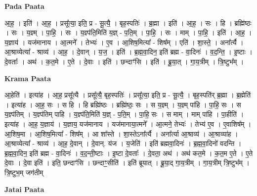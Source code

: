 \documentclass[17pt]{extarticle}
\begin{document}
\textbf{Pada Paata} \newline

आ॒ह॒ । इति॑ । आ॒ह॒ । प्रसू᳚त्या॒ इति॒ प्र - सू॒त्यै॒ । बृह॒स्पतिः॑ । ब्र॒ह्मा । इति॑ । आ॒ह॒ । सः । हि । ब्रह्मि॑ष्ठः । सः । य॒ज्ञ्म् । पा॒हि॒ । सः । य॒ज्ञ्प॑ति॒मिति॑ य॒ज्ञ् - प॒ति॒म् । पा॒हि॒ । सः । माम् । पा॒हि॒ । इति॑ । आ॒ह॒ । य॒ज्ञाय॑ । यज॑मानाय । आ॒त्मने᳚ । तेभ्यः॑ । ए॒व । आ॒शिष॒मित्या᳚ - शिष᳚म् । एति॑ । शा॒स्ते॒ । अना᳚र्त्यै । आ॒श्राव्येत्या᳚ - श्राव्य॑ । आ॒ह॒ । दे॒वान् । य॒ज॒ । इति॑ । ब्र॒ह्म॒वा॒दिन॒ इति॑ ब्रह्म - वा॒दिनः॑ । व॒द॒न्ति॒ । इ॒ष्टाः । दे॒वताः᳚ । अथ॑ । क॒त॒मे । ए॒ते । दे॒वाः । इति॑ । छन्दाꣳ॑सि । इति॑ । ब्रू॒या॒त् । गा॒य॒त्रीम् । त्रि॒ष्टुभ᳚म् ।  \newline


\textbf{Krama Paata} \newline

आ॒हेति॑ । इत्या॑ह । आ॒ह॒ प्रसू᳚त्यै । प्रसू᳚त्यै॒ बृह॒स्पतिः॑ । प्रसू᳚त्या॒ इति॒ प्र - सू॒त्यै॒ । बृह॒स्पति॑र् ब्र॒ह्मा । ब्र॒ह्मेति॑ । इत्या॑ह । आ॒ह॒ सः । स हि । हि ब्रह्मि॑ष्ठः । ब्रह्मि॑ष्ठः॒ सः । स य॒ज्ञ्म् । य॒ज्ञ्म् पा॑हि । पा॒हि॒ सः । स य॒ज्ञ्प॑तिम् । य॒ज्ञ्प॑तिम् पाहि । य॒ज्ञ्प॑ति॒मिति॑ य॒ज्ञ् - प॒ति॒म् । पा॒हि॒ सः । स माम् । माम् पा॑हि । पा॒हीति॑ । इत्या॑ह । आ॒ह॒ य॒ज्ञाय॑ । य॒ज्ञाय॒ यज॑मानाय । यज॑मानाया॒त्मने᳚ । आ॒त्मने॒ तेभ्यः॑ । तेभ्य॑ ए॒व । ए॒वाशिष᳚म् । आ॒शिष॒मा । आ॒शिष॒मित्या᳚ - शिष᳚म् । आ शा᳚स्ते । शा॒स्तेऽना᳚र्त्यै । अना᳚र्त्या आ॒श्राव्य॑ । आ॒श्राव्या॑ह । आ॒श्राव्येत्या᳚ - श्राव्य॑ । आ॒ह॒ दे॒वान् । दे॒वान्. य॑ज । य॒जेति॑ । इति॑ ब्रह्मवा॒दिनः॑ । ब्र॒ह्म॒वा॒दिनो॑ वदन्ति । ब्र॒ह्म॒वा॒दिन॒ इति॑ ब्रह्म - वा॒दिनः॑ । व॒द॒न्ती॒ष्टाः । इ॒ष्टा दे॒वताः᳚ । दे॒वता॒ अथ॑ । अथ॑ कत॒मे । क॒त॒म ए॒ते । ए॒ते दे॒वाः । दे॒वा इति॑ । इति॒ छन्दाꣳ॑सि । छन्दाꣳ॒॒सीति॑ । इति॑ ब्रूयात् । ब्रू॒या॒द् गा॒य॒त्रीम् । गा॒य॒त्रीम् त्रि॒ष्टुभ᳚म् । त्रि॒ष्टुभ॒म् जग॑तीम् \newline

\textbf{Jatai Paata} \newline
\end{document}
